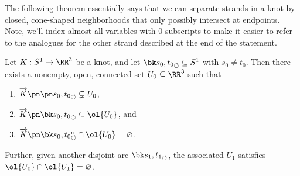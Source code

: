 The following theorem essentially says that we can separate strands in
a knot by closed, cone-shaped neighborhoods that only possibly
intersect at endpoints. Note, we'll index almost all variables with
$0$ subscripts to make it easier to refer to the analogues for the
other strand described at the end of the statement.
\begin{theorem}\label{thm:separating-strands}
  Let $K : S^1 \to \RR^3$ be a knot, and let $\sbk{s_0, t_0} \subseteq
  S^1$ with $s_0 \neq t_0$. Then there exists a nonempty, open,
  connected set $U_0 \subseteq \RR^3$ such that
  \begin{enumerate}
    \item $\fim{K}{\spn{s_0, t_0}} \subsetneq U_0$,
    \item $\fim{K}{\sbk{s_0, t_0}} \subseteq \ol{U_0}$, and
    \item $\fim{K}{\sbk{s_0, t_0}^c} \cap \ol{U_0} = \varnothing$.
  \end{enumerate}
  Further, given another disjoint arc $\sbk{s_1, t_1}$, the associated
  $U_1$ satisfies $\ol{U_0} \cap \ol{U_1} = \varnothing$.
\end{theorem}
